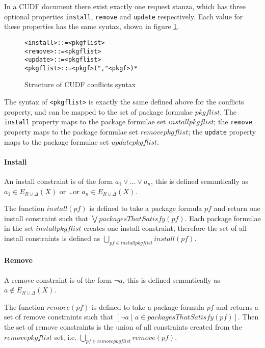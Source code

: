 In a CUDF document there exist exactly one request stanza, which has three optional properties \verb+install+, \verb+remove+ and \verb+update+ respectively.
Each value for these properties has the same syntax, shown in figure \ref{formal.requestssyntax}.

\begin{figure}[htp] 
\begin{center}
\begin{alltt}
<install> ::= <pkgflist>
<remove> ::= <pkgflist>
<update> ::= <pkgflist>
<pkgflist> ::= <pkgf> ("," <pkgf>)*
\end{alltt}
  \caption[CUDF Package conflicts syntax]{Structure of CUDF conflicts syntax}
  \label{formal.requestssyntax}
\end{center}
\end{figure}

The syntax of \verb+<pkgflist>+ is exactly the same defined above for the conflicts property, and can be mapped to the set of package formulae $pkgflist$.
The \verb+install+ property maps to the package formulae set $installpkgflist$; the \verb+remove+ property maps to the package formulae set $removepkgflist$;
the \verb+update+ property maps to the package formulae set  $updatepkgflist$.

\paragraph{Install}
An install constraint is of the form $a_1 \vee \ldots \vee a_n$,
this is defined semantically as $a_1 \in E_{R \cup \Delta}(X)$ or \ldots or $a_n \in E_{R \cup \Delta}(X)$.

The function  $install(pf)$ is defined to take a package formula $pf$ and return one install constraint such that $\bigvee packagesThatSatisfy(pf)$.
Each package formulae in the set $installpkgflist$ creates one install constraint,
therefore the set of all install constraints is defined as $\bigcup \limits_{pf \in installpkgflist} install(pf)$.

\paragraph{Remove}
A remove constraint is of the form $\neg a$,
this is defined semantically as $a \not \in E_{R \cup \Delta}(X)$.

The function $remove(pf)$ is defined to take a package formula $pf$ and returns a set of remove constraints such that $[\neg a \mid  a \in packagesThatSatisfy(pf)]$.
Then the set of remove constraints is the union of all constraints created from the $removepkgflist$ set, i.e. $\bigcup \limits_{pf \in removepkgflist} remove(pf)$.

